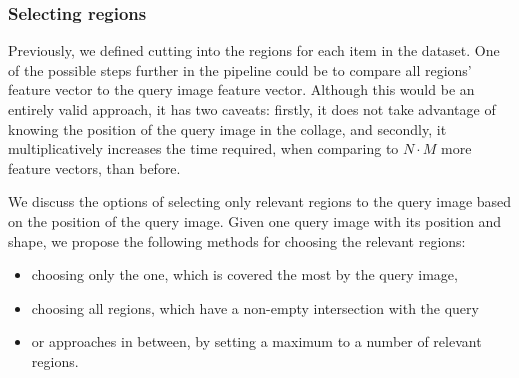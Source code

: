 



\subsubsection{Selecting regions}

Previously, we defined cutting into the regions for each item in the dataset. One of the possible steps further in the pipeline could be to compare all regions' feature vector to the query image feature vector. Although this would be an entirely valid approach, it has two caveats: firstly, it does not take advantage of knowing the position of the query image in the collage, and secondly, it multiplicatively increases the time required, when comparing to $N \cdot M$ more feature vectors, than before.

We discuss the options of selecting only relevant regions to the query image based on the position of the query image. Given one query image with its position and shape, we propose the following methods for choosing the relevant regions:
\begin{itemize}
  \item choosing only the one, which is covered the most by the query image,
  \item choosing all regions, which have a non-empty intersection with the query
  \item or approaches in between, by setting a maximum to a number of relevant regions.
\end{itemize}

